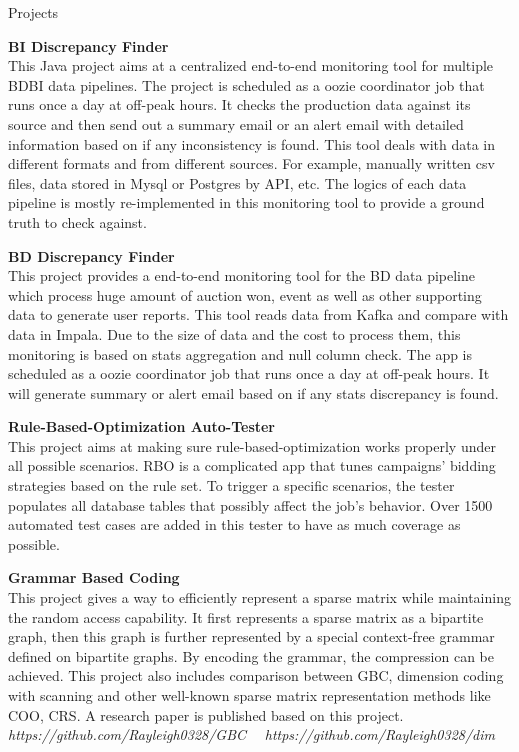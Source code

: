 \documentclass{resume} %
\begin{document}
\newpage

\begin{rSection}{Projects}

{\bf BI Discrepancy Finder}\\
This Java project aims at a centralized end-to-end monitoring tool for multiple BDBI data pipelines.
The project is scheduled as a oozie coordinator job that runs once a day at off-peak hours. 
It checks the production data against its source 
and then send out a summary email or an alert email with detailed information based on if any inconsistency is found.
This tool deals with data in different formats and from different sources. For example, manually written csv files, data stored in Mysql or Postgres by API, etc.
The logics of each data pipeline is mostly re-implemented in this monitoring tool to provide a ground truth to check against.      

{\bf BD Discrepancy Finder}\\
This project provides a end-to-end monitoring tool for the BD data pipeline 
which process huge amount of auction won, event as well as other supporting data to generate user reports.
This tool reads data from Kafka and compare with data in Impala.
Due to the size of data and the cost to process them, 
this monitoring is based on stats aggregation and null column check. 
The app is scheduled as a oozie coordinator job that runs once a day at off-peak hours. 
It will generate summary or alert email based on if any stats discrepancy is found.

{\bf Rule-Based-Optimization Auto-Tester}\\
This project aims at making sure rule-based-optimization works properly under all possible scenarios. 
RBO is a complicated app that tunes campaigns' bidding strategies based on the rule set. 
To trigger a specific scenarios, the tester populates all database tables that possibly affect the job's behavior. 
Over 1500 automated test cases are added in this tester to have as much coverage as possible.  

{\bf Grammar Based Coding}\\
This project gives a way to efficiently represent a sparse matrix 
while maintaining the random access capability.
It first represents a sparse matrix as a bipartite graph, 
then this graph is further represented by a special context-free grammar defined on bipartite graphs.
By encoding the grammar, the compression can be achieved.
This project also includes comparison between GBC, dimension coding with scanning and other 
well-known sparse matrix representation methods like COO, CRS.
A research paper is published based on this project.\\ 
\emph{https://github.com/Rayleigh0328/GBC} \ \ 
\emph{https://github.com/Rayleigh0328/dim}


\end{rSection}
\end{document}
